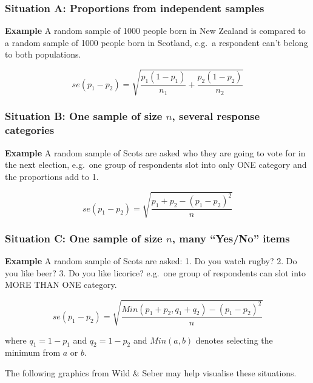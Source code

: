 \documentclass[
  oneside]{krantz}
\begin{document}
\hypertarget{situation-a-proportions-from-independent-samples}{%
\subsubsection{Situation A: Proportions from independent samples}\label{situation-a-proportions-from-independent-samples}}

\textbf{Example} A random sample of 1000 people born in New Zealand is compared to a random sample of 1000 people born in Scotland, e.g.~a respondent can't belong to both populations.

\[se(p_1-p_2) = \sqrt{\frac{p_1(1-p_1)}{n_1}+\frac{p_2(1-p_2)}{n_2}}\]

\hypertarget{situation-b-one-sample-of-size-n-several-response-categories}{%
\subsubsection{\texorpdfstring{Situation B: One sample of size \(n\), several response categories}{Situation B: One sample of size n, several response categories}}\label{situation-b-one-sample-of-size-n-several-response-categories}}

\textbf{Example} A random sample of Scots are asked who they are going to vote for in the next election, e.g.~one group of respondents slot into only ONE category and the proportions add to 1.

\[se(p_1-p_2) =\sqrt{\frac{p_1+ p_2-(p_1-p_2)^2}{n}}\]

\hypertarget{situation-c-one-sample-of-size-n-many-yesno-items}{%
\subsubsection{\texorpdfstring{Situation C: One sample of size \(n\), many ``Yes/No'' items}{Situation C: One sample of size n, many ``Yes/No'' items}}\label{situation-c-one-sample-of-size-n-many-yesno-items}}

\textbf{Example} A random sample of Scots are asked:
1. Do you watch rugby?
2. Do you like beer?
3. Do you like licorice?
e.g.~one group of respondents can slot into MORE THAN ONE category.

\[se(p_1-p_2) = \sqrt{\frac{Min(p_1 + p_2,  q_1 + q_2)-(p_1-p_2)^2}{n}}\]

where \(q_1 = 1-p_1\) and \(q_2 = 1-p_2\) and \(Min(a, b)\) denotes selecting the minimum from \(a\) or \(b\).

The following graphics from Wild \& Seber\citeyearpar{wildgaf} may help visualise these situations.
\end{document}
